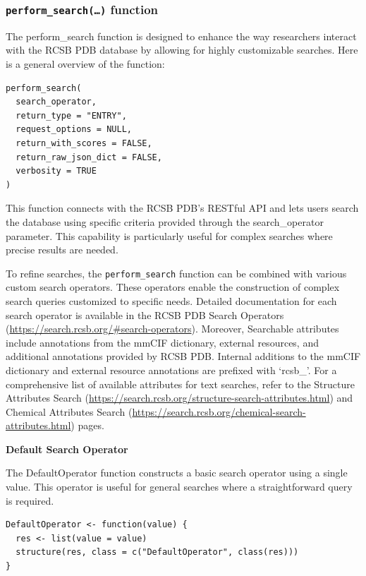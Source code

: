 \subsubsection{\texorpdfstring{\texttt{perform\_search(…)} function}{perform\_search(\ldots) function}}\label{perform_search-function}

The perform\_search function is designed to enhance the way researchers interact with the RCSB PDB database by allowing for highly customizable searches. Here is a general overview of the function:

\begin{verbatim}
perform_search(
  search_operator,
  return_type = "ENTRY",
  request_options = NULL,
  return_with_scores = FALSE,
  return_raw_json_dict = FALSE,
  verbosity = TRUE
)
\end{verbatim}

This function connects with the RCSB PDB's RESTful API and lets users search the database using specific criteria provided through the search\_operator parameter. This capability is particularly useful for complex searches where precise results are needed.

To refine searches, the \texttt{perform\_search} function can be combined with various custom search operators. These operators enable the construction of complex search queries customized to specific needs. Detailed documentation for each search operator is available in the RCSB PDB Search Operators (\url{https://search.rcsb.org/\#search-operators}). Moreover, Searchable attributes include annotations from the mmCIF dictionary, external resources, and additional annotations provided by RCSB PDB. Internal additions to the mmCIF dictionary and external resource annotations are prefixed with `rcsb\_'. For a comprehensive list of available attributes for text searches, refer to the Structure Attributes Search (\url{https://search.rcsb.org/structure-search-attributes.html}) and Chemical Attributes Search (\url{https://search.rcsb.org/chemical-search-attributes.html}) pages.

\textbf{Default Search Operator}

The DefaultOperator function constructs a basic search operator using a single value. This operator is useful for general searches where a straightforward query is required.

\begin{verbatim}
DefaultOperator <- function(value) {
  res <- list(value = value)
  structure(res, class = c("DefaultOperator", class(res)))
}
\end{verbatim}

